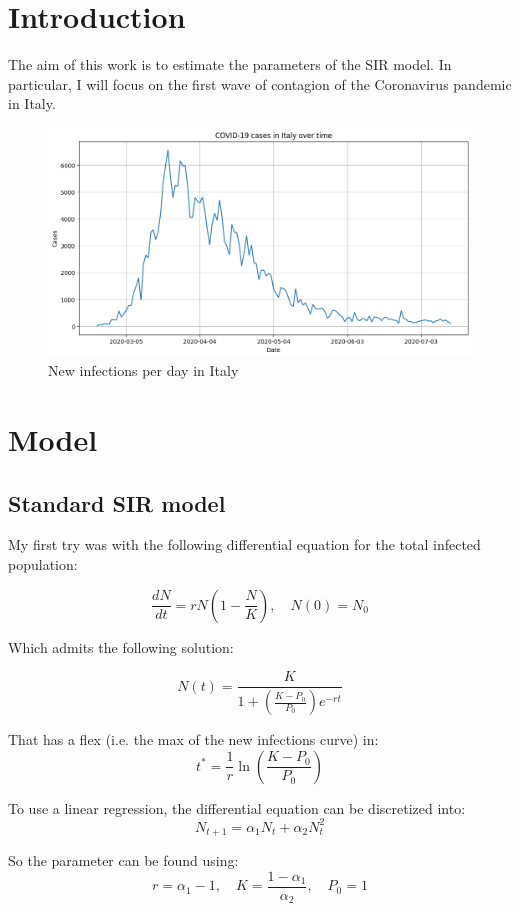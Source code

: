 \documentclass[12pt]{article}
\begin{document}
    \section{Introduction}
    The aim of this work is to estimate the parameters of the SIR model.
    In particular, I will focus on the first wave of contagion of the Coronavirus pandemic in Italy.

    \begin{figure}[h!]
        \label{fig:covid_italy}
        \centering
        \includegraphics[width=.8\linewidth]{plots/real_data}
        \caption{New infections per day in Italy}
    \end{figure}

    \section{Model}

    \subsection{Standard SIR model}
    My first try was with the following differential equation for the total infected population:

    $$\frac{dN}{dt} = r N \left(1-\frac{N}{K}\right), \quad N(0)=N_0$$

    Which admits the following solution:

    $$N(t) = \frac{K}{1+ \left(\frac{K-P_0}{P_0}\right) e^{-rt}}$$

    That has a flex (i.e. the max of the new infections curve) in:
    $$ t^* = \frac{1}{r}\ln \left(\frac{K-P_0}{P_0}\right)$$

    To use a linear regression, the differential equation can be discretized into:
    $$ N_{t+1} = \alpha_1 N_t + \alpha_2 N_{t}^2$$

    So the parameter can be found using:
    $$ r = \alpha_1-1, \quad K= \frac{1-\alpha_1}{\alpha_2}, \quad P_0 = 1$$
\end{document}
